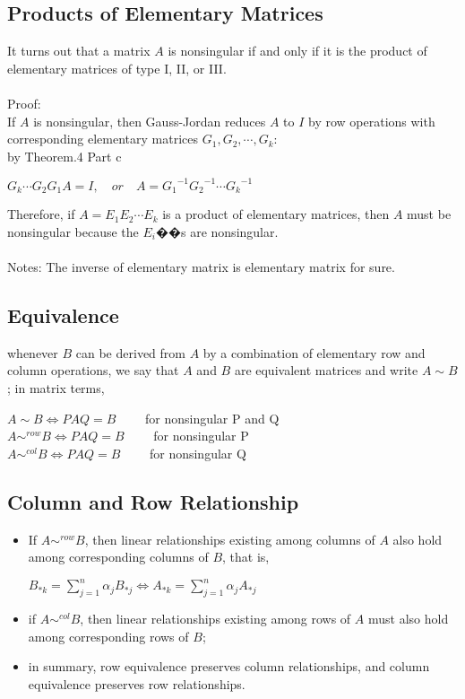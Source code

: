 \documentclass[UTF8,a4paper, 10pt, openany]{book}
\begin{document}
\subsection{Products of Elementary Matrices}
It turns out that a matrix $A$ is nonsingular if and only if it is the product of elementary matrices of type I, II, or III.
\\ \\
Proof:\\
If $A$ is nonsingular, then Gauss-Jordan reduces $A$ to $I$ by row operations with corresponding elementary matrices $G_1, G_2, \cdots , G_k$:\\
by Theorem.4 Part c
\begin{center}
$G_k\cdots G_2G_1A=I,\quad or \quad A={G_1}^{-1}{G_2}^{-1}\cdots {G_k}^{-1}$
\end{center}
Therefore, if $A = E_1E_2 \cdots E_k$ is a product of elementary matrices,
then $A$ must be nonsingular because the $E_i$��s are nonsingular.\\ \\
Notes: The inverse of elementary matrix is elementary matrix for sure.
\subsection{Equivalence}
whenever $B$ can be derived from $A$ by a combination of elementary row and column operations, we say that $A$ and $B$ are equivalent matrices and write $A \sim B$; in matrix terms,
\begin{center}
$A \sim B \iff PAQ=B \qquad$ for nonsingular P and Q\\
$A \sim ^{row} B \iff PAQ=B \qquad$ for nonsingular P\\
$A \sim ^{col} B \iff PAQ=B \qquad$ for nonsingular Q
\end{center}
\subsection{Column and Row Relationship}
\begin{itemize}
\item If $A \sim ^{row} B$, then linear relationships existing among columns of $A$ also hold among corresponding columns of $B$, that is,
\begin{center}
$B_{*k}=\displaystyle\sum_{j=1}^{n}\alpha_{j}B_{*j} \iff A_{*k}=\displaystyle\sum_{j=1}^{n}\alpha_{j}A_{*j}$
\end{center}
\item if $A \sim ^{col} B$, then linear relationships existing among rows of $A$ must
also hold among corresponding rows of $B$;
\item in summary, row equivalence preserves column relationships, and column equivalence preserves row relationships.
\end{itemize}
\end{document}
